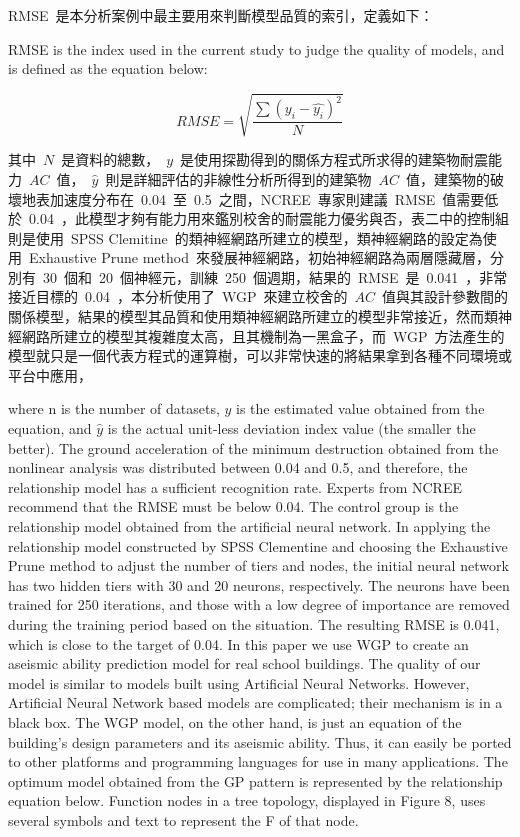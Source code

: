 RMSE~是本分析案例中最主要用來判斷模型品質的索引，定義如下：

RMSE is the index used in the current study to judge the quality of models, and is defined as the equation below:

\begin{equation} RMSE = \sqrt{\dfrac{\sum{(y_i - \hat{y_i})^2}}{N}} \label{eq:RMSE}\end{equation}

其中~$N$~是資料的總數，~$y$~是使用探勘得到的關係方程式所求得的建築物耐震能力~$AC$~值，~$\hat{y}$~則是詳細評估的非線性分析所得到的建築物~$AC$~值，建築物的破壞地表加速度分布在~0.04~至~0.5~之間，NCREE~專家則建議~RMSE~值需要低於~0.04~，此模型才夠有能力用來鑑別校舍的耐震能力優劣與否，表二中的控制組則是使用~SPSS Clemitine~的類神經網路所建立的模型，類神經網路的設定為使用~Exhaustive Prune method~來發展神經網路，初始神經網路為兩層隱藏層，分別有~30~個和~20~個神經元，訓練~250~個週期，結果的~RMSE~是~0.041~，非常接近目標的~0.04~，本分析使用了~WGP~來建立校舍的~$AC$~值與其設計參數間的關係模型，結果的模型其品質和使用類神經網路所建立的模型非常接近，然而類神經網路所建立的模型其複雜度太高，且其機制為一黑盒子，而~WGP~方法產生的模型就只是一個代表方程式的運算樹，可以非常快速的將結果拿到各種不同環境或平台中應用，

where n is the number of datasets, $y$ is the estimated value obtained from the equation, and $\hat{y}$ is the actual unit-less deviation index value (the smaller the better). The ground acceleration of the minimum destruction obtained from the nonlinear analysis was distributed between 0.04 and 0.5, and therefore, the relationship model has a sufficient recognition rate. Experts from NCREE recommend that the RMSE must be below 0.04. The control group is the relationship model obtained from the artificial neural network. In applying the relationship model constructed by SPSS Clementine and choosing the Exhaustive Prune method to adjust the number of tiers and nodes, the initial neural network has two hidden tiers with 30 and 20 neurons, respectively. The neurons have been trained for 250 iterations, and those with a low degree of importance are removed during the training period based on the situation. The resulting RMSE is 0.041, which is close to the target of 0.04. In this paper we use WGP to create an aseismic ability prediction model for real school buildings. The quality of our model is similar to models built using Artificial Neural Networks. However, Artificial Neural Network based models are complicated; their mechanism is in a black box. The WGP model, on the other hand, is just an equation of the building’s design parameters and its aseismic ability. Thus, it can easily be ported to other platforms and programming languages for use in many applications. The optimum model obtained from the GP pattern is represented by the relationship equation below. Function nodes in a tree topology, displayed in Figure 8, uses several symbols and text to represent the F of that node.

